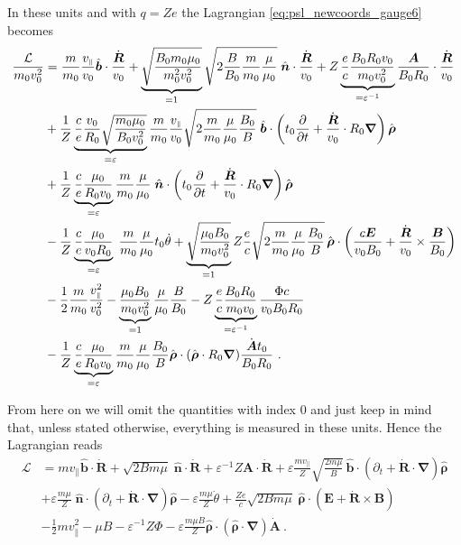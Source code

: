 \documentclass{scrartcl}
\renewcommand{\vec}[1]{\boldsymbol{#1}}
\newcommand{\uv}[1]{\hat{\vec{#1}}}
\newcommand{\bnabla}{\vec{\nabla}}
\newcommand{\rvgc}{\vec{R}} %
\newcommand{\PSL}{\mathcal{L}}
\newcommand{\subparallel}{{\scriptscriptstyle\parallel}}
\begin{document}
In these units and with $q=Ze$ the Lagrangian \eqref{eq:psl_newcoords_gauge6} becomes
\begin{align}
\frac{\PSL}{m_0v_0^2} &= \frac{m}{m_0}\frac{v_\subparallel}{v_0} \uv{b}\cdot\frac{\dot{\rvgc}}{v_0} + \underbrace{\sqrt{\frac{B_0m_0\mu_0}{m_0^2v_0^2}}}_{=1}\sqrt{2\frac{B}{B_0}\frac{m}{m_0}\frac{\mu}{\mu_0}}\;\uv{n}\cdot\frac{\dot{\rvgc}}{v_0} + Z\underbrace{\frac{e}{c}\frac{B_0R_0v_0}{m_0v_0^2}}_{=\varepsilon^{-1}}\frac{\vec{A}}{B_0R_0}\cdot\frac{\dot{\rvgc}}{v_0} \nonumber\\ 
& + \frac{1}{Z}\underbrace{\frac{c}{e}\frac{v_0}{R_0}\sqrt{\frac{m_0\mu_0}{B_0v_0^2}}}_{=\varepsilon}\frac{m}{m_0}\frac{v_\subparallel}{v_0}\sqrt{2\frac{m}{m_0}\frac{\mu}{\mu_0}\frac{B_0}{B}}\;\uv{b}\cdot\left(t_0\pdv{t} + \frac{\dot{\rvgc}}{v_0}\cdot R_0\bnabla\right)\uv{\rho}  \nonumber\\
& + \frac{1}{Z}\underbrace{\frac{c}{e}\frac{\mu_0}{R_0v_0}}_{=\varepsilon}\frac{m}{m_0}\frac{\mu}{\mu_0}\;\uv{n}\cdot\left(t_0\pdv{t} + \frac{\dot{\rvgc}}{v_0}\cdot R_0\bnabla\right)\uv{\rho} \nonumber\\
& - \frac{1}{Z}\underbrace{\frac{c}{e}\frac{\mu_0}{v_0R_0}}_{=\varepsilon}\;\frac{m}{m_0}\frac{\mu}{\mu_0}t_0\dot{\theta} + \underbrace{\sqrt{\frac{\mu_0B_0}{m_0v_0^2}}}_{=1} Z\frac{e}{c}\sqrt{2\frac{m}{m_0}\frac{\mu}{\mu_0}\frac{B_0}{B}}\,\uv{\rho}\cdot\left(\frac{c\vec{E}}{v_0B_0}+\frac{\dot{\rvgc}}{v_0}\times\frac{\vec{B}}{B_0}\right) \nonumber\\
& - \frac12\frac{m}{m_0}\frac{v_\subparallel^2}{v_0^2} - \underbrace{\frac{\mu_0B_0}{m_0v_0^2}}_{=1} \frac{\mu}{\mu_0} \frac{B}{B_0} - Z\underbrace{\frac{e}{c}\frac{B_0R_0}{m_0v_0}}_{=\varepsilon^{-1}} \frac{\Phi c}{v_0B_0R_0} \nonumber \\
& - \frac{1}{Z}\underbrace{\frac{c}{e}\frac{\mu_0}{R_0v_0}}_{=\varepsilon} \frac{m}{m_0}\frac{\mu}{\mu_0}\frac{B_0}{B}\uv{\rho}\cdot(\uv{\rho}\cdot R_0\bnabla)\frac{\dot{\vec{A}}t_0}{B_0R_0} \ . \label{eq:psl_newcoords_dimless0}
\end{align}

From here on we will omit the quantities with index 0 and just keep in mind that, unless stated otherwise, everything is measured in these units. Hence the Lagrangian reads
\begin{align}
\PSL &= mv_\subparallel \uv{b}\cdot\dot{\rvgc} + \sqrt{2Bm\mu}\;\uv{n}\cdot\dot{\rvgc} + \varepsilon^{-1}Z\vec{A}\cdot\dot{\rvgc} + \varepsilon \frac{mv_\subparallel}{Z} \sqrt{\frac{2m\mu}{B}}\,\uv{b}\cdot\left(\partial_t+\dot{\rvgc}\cdot\bnabla\right)\uv{\rho} \nonumber\\
& + \varepsilon \frac{m\mu}{Z}\;\uv{n}\cdot\left(\partial_t+\dot{\rvgc}\cdot\bnabla\right)\uv{\rho} - \varepsilon \frac{m\mu}{Z}\dot{\theta} + \frac{Ze}{c}\sqrt{2Bm\mu}\;\uv{\rho}\cdot\left(\vec{E} + \dot{\rvgc}\times\vec{B}\right) \nonumber\\
& - \frac12mv_\subparallel^2 - \mu B - \varepsilon^{-1} Z\Phi  - \varepsilon \frac{m\mu B}{Z}\uv{\rho}\cdot\left(\uv{\rho}\cdot\bnabla\right)\dot{\vec{A}} \ . \label{eq:psl_newcoords_dimless1}
\end{align}
\end{document}
